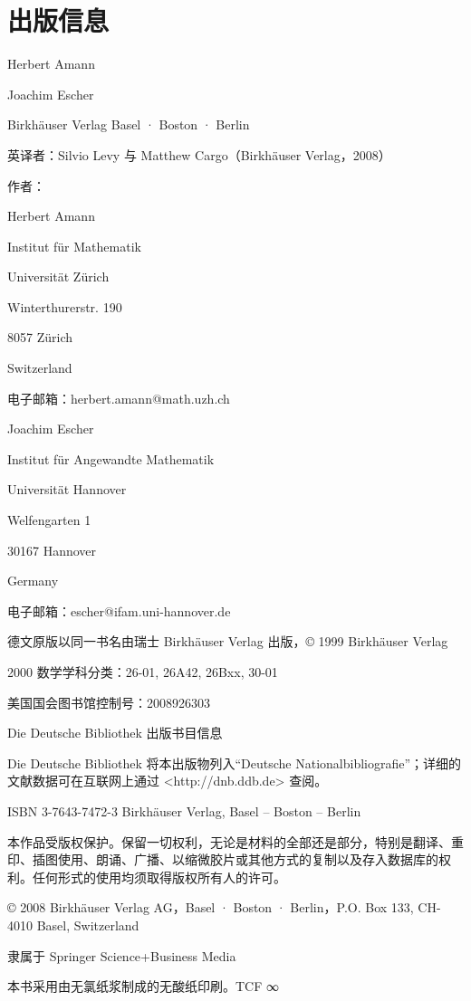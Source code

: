 \chapter*{出版信息}

Herbert Amann

Joachim Escher

Birkhäuser Verlag Basel · Boston · Berlin

英译者：Silvio Levy 与 Matthew Cargo（Birkhäuser Verlag，2008）

作者：

Herbert Amann

Institut für Mathematik

Universität Zürich

Winterthurerstr. 190

8057 Zürich

Switzerland

电子邮箱：herbert.amann@math.uzh.ch

Joachim Escher

Institut für Angewandte Mathematik

Universität Hannover

Welfengarten 1

30167 Hannover

Germany

电子邮箱：escher@ifam.uni-hannover.de

德文原版以同一书名由瑞士 Birkhäuser Verlag 出版，© 1999 Birkhäuser Verlag

2000 数学学科分类：26-01, 26A42, 26Bxx, 30-01

美国国会图书馆控制号：2008926303

Die Deutsche Bibliothek 出版书目信息

Die Deutsche Bibliothek 将本出版物列入“Deutsche Nationalbibliografie”；详细的文献数据可在互联网上通过 <http://dnb.ddb.de> 查阅。

ISBN 3-7643-7472-3 Birkhäuser Verlag, Basel – Boston – Berlin

本作品受版权保护。保留一切权利，无论是材料的全部还是部分，特别是翻译、重印、插图使用、朗诵、广播、以缩微胶片或其他方式的复制以及存入数据库的权利。任何形式的使用均须取得版权所有人的许可。

© 2008 Birkhäuser Verlag AG，Basel · Boston · Berlin，P.O. Box 133, CH-4010 Basel, Switzerland

隶属于 Springer Science+Business Media

本书采用由无氯纸浆制成的无酸纸印刷。TCF ∞

